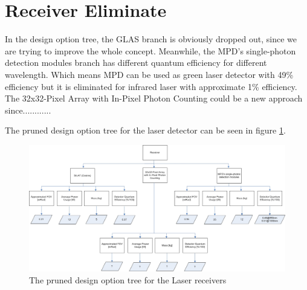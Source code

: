 \section{Receiver Eliminate}
\label{pruneReceiver}
In the design option tree, the GLAS branch is obviously dropped out, since we are trying to improve the whole concept. Meanwhile, the \ac{MPD}'s single-photon detection modules branch has different quantum efficiency for different wavelength. Which means MPD can be used as green laser detector with 49\% efficiency but it is eliminated for infrared laser with approximate 1\% efficiency. The 32x32-Pixel Array with In-Pixel Photon Counting could be a new approach since............

The pruned design option tree for the laser detector can be seen in figure \ref{fig:DOTreceiverPruned}.

\begin{figure}
\centering
\includegraphics[width=\textheight, angle=90]{chapters/img/DOTreceiverPruned.jpg}
\caption{The pruned design option tree for the Laser receivers}
\label{fig:DOTreceiverPruned}
\end{figure}